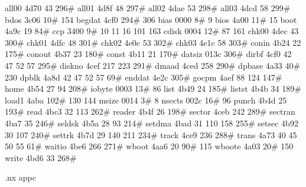 all00          4d70      43     296#
all01          4d8f      48     297#
all02          4dae      53     298#
all03          4dcd      58     299#
bdos           3c06      10#    154
begdat         4cf0     294#    306
bias           0000       8#      9
bios           4a00      11#     15
boot           4a9c      19      84#
ccp            3400       9#     10      11      16     101     163
cdisk          0004      12#     87     161
chk00          4dec      43     300#
chk01          4dfc      48     301#
chk02          4e0c      53     302#
chk03          4e1c      58     303#
conin          4b24      22     175#
conout         4b37      23     180#
const          4b11      21     170#
datsiz         013c     306#
dirbf          4cf0      42      47      52      57     295#
diskno         4cef     217     223     291#
dmaad          4ced     258     290#
dpbase         4a33      40#    230
dpblk          4a8d      42      47      52      57      69#
enddat         4e2c     305#
gocpm          4aef      88     124     147#
home           4b54      27      94     208#
iobyte         0003      13#     86
list           4b49      24     185#
listst         4b4b      34     189#
load1          4aba     102#    130     144
msize          0014       3#      8
nsects         002c      16#     96
punch          4b4d      25     193#
read           4bc3      32     113     262#
reader         4b4f      26     198#
sector         4ceb     242     289#
sectran        4ba7      35     246#
seldsk         4b5a      28      93     214#
setdma         4bad      31     110     158     255#
setsec         4b92      30     107     240#
settrk         4b7d      29     140     211     234#
track          4ce9     236     288#
trans          4a73      40      45      50      55      61#
waitio         4be6     266     271#
wboot          4aa6      20      90#    115
wboote         4a03      20#    150
write          4bd6      33     268#


.nx appc
